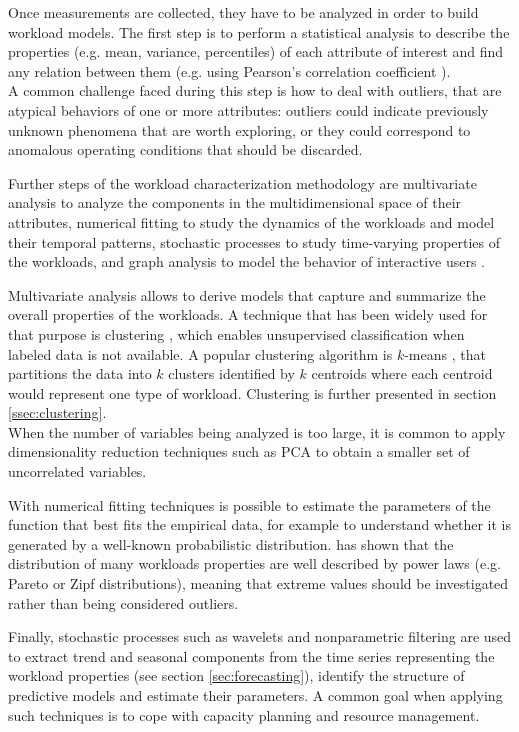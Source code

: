 \documentclass[a4paper, 12pt]{article} %
\begin{document}
	Once measurements are collected, they have to be analyzed in order to build workload models. The first step is to perform a statistical analysis to describe the properties (e.g. mean, variance, percentiles) of each attribute of interest and find any relation between them (e.g. using Pearson's correlation coefficient \cite{PearsonCoefficient}). \\
	A common challenge faced during this step is how to deal with outliers, that are atypical behaviors of one or more attributes: outliers could indicate previously unknown phenomena that are worth exploring, or they could correspond to anomalous operating conditions that should be discarded.
	
	Further steps of the workload characterization methodology are multivariate analysis to analyze the components in the multidimensional space of their attributes, numerical fitting to study the dynamics of the workloads and model their temporal patterns, stochastic processes to study time-varying properties of the workloads, and graph analysis to model the behavior of interactive users \cite{WorkloadCharacterization}.
	
	Multivariate analysis allows to derive models that capture and summarize the overall properties of the workloads. A technique that has been widely used for that purpose is clustering \cite{ClusteringSurvey}, which enables unsupervised classification when labeled data is not available. A popular clustering algorithm is $k$-means \cite{ClusteringSurvey}, that partitions the data into $k$ clusters identified by $k$ centroids where each centroid would represent one type of workload. Clustering is further presented in section \ref{ssec:clustering}.\\
	When the number of variables being analyzed is too large, it is common to apply dimensionality reduction techniques such as PCA \cite{PCA} to obtain a smaller set of uncorrelated variables.
	
	With numerical fitting techniques is possible to estimate the parameters of the function that best fits the empirical data, for example to understand whether it is generated by a well-known probabilistic distribution. \cite{WorkloadsPowerLaw} has shown that the distribution of many workloads properties are well described by power laws (e.g. Pareto or Zipf distributions), meaning that extreme values should be investigated rather than being considered outliers.
	
	Finally, stochastic processes such as wavelets and nonparametric filtering are used to extract trend and seasonal components from the time series representing the workload properties (see section \ref{sec:forecasting}), identify the structure of predictive models and estimate their parameters. A common goal when applying such techniques is to cope with capacity planning and resource management.
	
\end{document}
